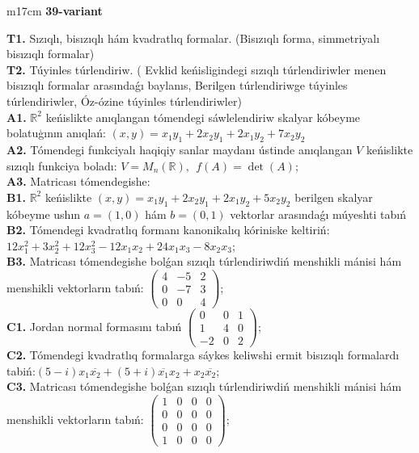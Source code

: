 \documentclass{article}
\begin{document}
\begin{tabular}{m{17cm}}
\textbf{39-variant}
\newline

\textbf{T1.} Sızıqlı, bisızıqlı hám kvadratlıq formalar. (Bisızıqlı forma,  simmetriyalı bisızıqlı formalar)  \\
\textbf{T2.} Túyinles túrlendiriw. ( Evklid keńisligindegi sızıqlı túrlendiriwler menen bisızıqlı formalar arasındaǵı baylanıs, Berilgen túrlendiriwge túyinles túrlendiriwler, Óz-ózine túyinles túrlendiriwler) \\
\textbf{A1.} \(\mathbb{R}^{2}\) keńislikte anıqlangan tómendegi sáwlelendiriw skalyar kóbeyme bolatuģının anıqlań: \((x,y) = x_{1}y_{1} + 2x_{2}y_{1} + 2x_{1}y_{2} + 7x_{2}y_{2}\) \\
\textbf{A2.} Tómendegi funkciyalı haqiqiy sanlar maydanı ústinde anıqlangan \(V\) keńislikte sızıqlı funkciya boladı: \(V = M_{n}\left( \mathbb{R} \right),\ \ f(A) = \det(A)\); \\
\textbf{A3.} Matricası tómendegishe: \\
\textbf{B1.} \(\mathbb{R}^{2}\) keńislikte \((x,y) = x_{1}y_{1} + 2x_{2}y_{1} + 2x_{1}y_{2} + 5x_{2}y_{2}\) berilgen skalyar kóbeyme ushın \(a = (1,0)\) hám \(b = (0,1)\) vektorlar arasındaǵı múyeshti tabıń \\
\textbf{B2.} Tómendegi kvadratlıq formanı kanonikalıq kóriniske keltiriń: \(12x_{1}^{2} + 3x_{2}^{2} + 12x_{3}^{2} - 12x_{1}x_{2} + 24x_{1}x_{3} - 8x_{2}x_{3}\); \\
\textbf{B3.} Matricası tómendegishe bolǵan sızıqlı túrlendiriwdiń menshikli mánisi hám menshikli vektorların tabıń: \(\begin{pmatrix} 4 & - 5 & 2 \\ 0 & - 7 & 3 \\ 0 & 0 & 4 \end{pmatrix}\); \\
\textbf{C1.} Jordan normal formasını tabıń \(\begin{pmatrix} 0 & 0 & 1 \\ 1 & 4 & 0 \\  - 2 & 0 & 2 \end{pmatrix}\); \\
\textbf{C2.} Tómendegi kvadratlıq formalarga sáykes keliwshi ermit bisızıqlı formalardı tabiń:\((5 - i)x_{1}\overline{x_{2}} + (5 + i)\overline{x_{1}}x_{2} + x_{2}\overline{x_{2}}\); \\
\textbf{C3.} Matricası tómendegishe bolǵan sızıqlı túrlendiriwdiń menshikli mánisi hám menshikli vektorların tabıń: \(\begin{pmatrix} 1 & 0 & 0 & 0 \\ 0 & 0 & 0 & 0 \\ 0 & 0 & 0 & 0 \\ 1 & 0 & 0 & 0 \end{pmatrix}\); \\

\end{tabular}
\vspace{1cm}
\end{document}
